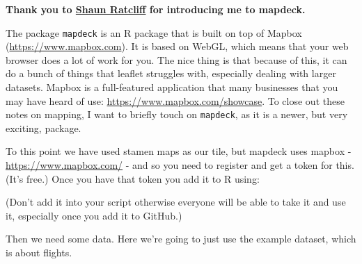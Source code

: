 \documentclass[
]{book}
\newenvironment{Shaded}{\begin{snugshade}}{\end{snugshade}}
\newcommand{\CommentTok}[1]{\textcolor[rgb]{0.56,0.35,0.01}{\textit{#1}}}
\newcommand{\KeywordTok}[1]{\textcolor[rgb]{0.13,0.29,0.53}{\textbf{#1}}}
\newcommand{\NormalTok}[1]{#1}
\newcommand{\OperatorTok}[1]{\textcolor[rgb]{0.81,0.36,0.00}{\textbf{#1}}}
\newcommand{\StringTok}[1]{\textcolor[rgb]{0.31,0.60,0.02}{#1}}
\begin{document}
\textbf{Thank you to \href{https://shaunratcliff.com/}{Shaun Ratcliff} for introducing me to mapdeck.}

The package \texttt{mapdeck} is an R package that is built on top of Mapbox (\url{https://www.mapbox.com}). It is based on WebGL, which means that your web browser does a lot of work for you. The nice thing is that because of this, it can do a bunch of things that leaflet struggles with, especially dealing with larger datasets. Mapbox is a full-featured application that many businesses that you may have heard of use: \url{https://www.mapbox.com/showcase}. To close out these notes on mapping, I want to briefly touch on \texttt{mapdeck}, as it is a newer, but very exciting, package.

To this point we have used stamen maps as our tile, but mapdeck uses mapbox - \url{https://www.mapbox.com/} - and so you need to register and get a token for this. (It's free.) Once you have that token you add it to R using:

\begin{Shaded}
\end{Shaded}

(Don't add it into your script otherwise everyone will be able to take it and use it, especially once you add it to GitHub.)

Then we need some data. Here we're going to just use the example dataset, which is about flights.

\begin{Shaded}
\end{Shaded}
\end{document}
